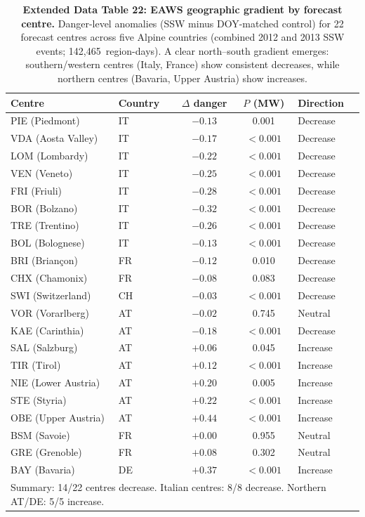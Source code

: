 \documentclass[11pt,letterpaper]{article}
\begin{document}
\begin{table}[!ht]
\centering
\caption{\textbf{Extended Data Table 22: EAWS geographic gradient by forecast centre.}
Danger-level anomalies (SSW minus DOY-matched control) for 22 forecast centres across five Alpine countries (combined 2012 and 2013 SSW events; 142,465~region-days). A clear north--south gradient emerges: southern/western centres (Italy, France) show consistent decreases, while northern centres (Bavaria, Upper Austria) show increases.}
\label{tab:eaws_gradient}
\small
\begin{tabular}{llccl}
\toprule
Centre & Country & $\Delta$ danger & $P$ (MW) & Direction \\
\midrule
PIE (Piedmont) & IT & $-0.13$ & 0.001 & Decrease \\
VDA (Aosta Valley) & IT & $-0.17$ & $< 0.001$ & Decrease \\
LOM (Lombardy) & IT & $-0.22$ & $< 0.001$ & Decrease \\
VEN (Veneto) & IT & $-0.25$ & $< 0.001$ & Decrease \\
FRI (Friuli) & IT & $-0.28$ & $< 0.001$ & Decrease \\
BOR (Bolzano) & IT & $-0.32$ & $< 0.001$ & Decrease \\
TRE (Trentino) & IT & $-0.26$ & $< 0.001$ & Decrease \\
BOL (Bolognese) & IT & $-0.13$ & $< 0.001$ & Decrease \\
BRI (Briançon) & FR & $-0.12$ & 0.010 & Decrease \\
CHX (Chamonix) & FR & $-0.08$ & 0.083 & Decrease \\
SWI (Switzerland) & CH & $-0.03$ & $< 0.001$ & Decrease \\
VOR (Vorarlberg) & AT & $-0.02$ & 0.745 & Neutral \\
KAE (Carinthia) & AT & $-0.18$ & $< 0.001$ & Decrease \\
SAL (Salzburg) & AT & $+0.06$ & 0.045 & Increase \\
TIR (Tirol) & AT & $+0.12$ & $< 0.001$ & Increase \\
NIE (Lower Austria) & AT & $+0.20$ & 0.005 & Increase \\
STE (Styria) & AT & $+0.22$ & $< 0.001$ & Increase \\
OBE (Upper Austria) & AT & $+0.44$ & $< 0.001$ & Increase \\
BSM (Savoie) & FR & $+0.00$ & 0.955 & Neutral \\
GRE (Grenoble) & FR & $+0.08$ & 0.302 & Neutral \\
BAY (Bavaria) & DE & $+0.37$ & $< 0.001$ & Increase \\
\bottomrule
\multicolumn{5}{l}{\footnotesize Summary: 14/22 centres decrease. Italian centres: 8/8 decrease. Northern AT/DE: 5/5 increase.}
\end{tabular}
\end{table}
\end{document}
